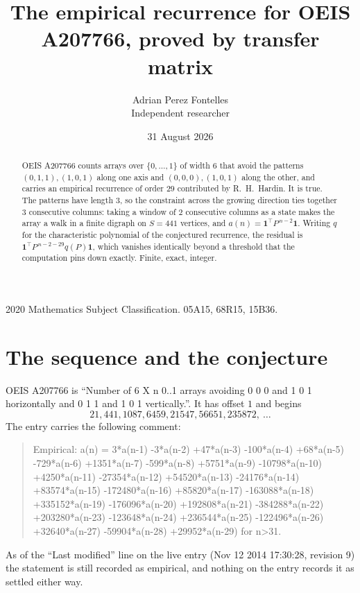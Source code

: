 \documentclass[11pt,a4paper]{article}
\title{The empirical recurrence for OEIS A207766, proved by transfer matrix}
\author{Adrian Perez Fontelles\\ \small Independent researcher}
\date{31 August 2026}
\theoremstyle{plain}
\theoremstyle{definition}
\begin{document}
\maketitle

\begin{abstract}
OEIS A207766 counts arrays over $\{0,\dots,1\}$ of width $6$ that avoid the patterns
$(0,1,1), (1,0,1)$ along one axis and $(0,0,0), (1,0,1)$ along the other, and carries an empirical recurrence of
order $29$ contributed by R.~H.~Hardin. It is true. The patterns have length $3$, so
the constraint across the growing direction ties together $3$ consecutive columns: taking a
window of $2$ consecutive columns as a state makes the array a walk in a finite digraph
on $S=441$ vertices, and $a(n)=\mathbf{1}^{\!\top}P^{\,n-2}\mathbf{1}$. Writing $q$
for the characteristic polynomial of the conjectured recurrence, the residual is
$\mathbf{1}^{\!\top}P^{\,n-2-29}q(P)\mathbf{1}$, which vanishes identically
beyond a threshold that the computation pins down exactly. Finite, exact, integer.
\end{abstract}

\noindent\small 2020 Mathematics Subject Classification. 05A15, 68R15, 15B36.\normalsize

\section{The sequence and the conjecture}

OEIS A207766 is ``Number of 6 X n 0..1 arrays avoiding 0 0 0 and 1 0 1 horizontally and 0 1 1 and 1 0 1 vertically.''. It has offset
$1$ and begins
\[
21, 441, 1087, 6459, 21547, 56651, 235872,\ \dots
\]
The entry carries the following comment:
\begin{quote}\small
Empirical: a(n) = 3*a(n-1) -3*a(n-2) +47*a(n-3) -100*a(n-4) +68*a(n-5) -729*a(n-6) +1351*a(n-7) -599*a(n-8) +5751*a(n-9) -10798*a(n-10) +4250*a(n-11) -27354*a(n-12) +54520*a(n-13) -24176*a(n-14) +83574*a(n-15) -172480*a(n-16) +85820*a(n-17) -163088*a(n-18) +335152*a(n-19) -176096*a(n-20) +192808*a(n-21) -384288*a(n-22) +203280*a(n-23) -123648*a(n-24) +236544*a(n-25) -122496*a(n-26) +32640*a(n-27) -59904*a(n-28) +29952*a(n-29) for n>31.
\end{quote}
As of the ``Last modified'' line on the live entry (Nov 12 2014 17:30:28, revision
9) the statement is still recorded as empirical, and nothing on the entry
records it as settled either way.
\end{document}
